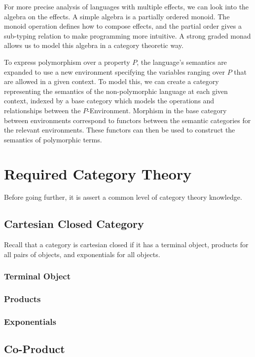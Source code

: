 \documentclass{Report}
\begin{document}
For more precise analysis of languages with multiple effects, we can look into the algebra on the effects. A simple algebra is a partially ordered monoid. The monoid operation defines how to compose effects, and the partial order gives a sub-typing relation to make programming more intuitive. A strong graded monad allows us to model this algebra in a category theoretic way.

To express polymorphism over a property $P$, the language's semantics are expanded to use a new environment specifying the variables ranging over $P$ that are allowed in a given context. To model this, we can create a category representing the semantics of the non-polymorphic language at each given context, indexed by a base category which models the operations and relationships between the $P$-Environment. Morphism in the base category between environments correspond to functors between the semantic categories for the relevant environments. These functors can then be used to construct the semantics of polymorphic terms. 


\chapter{Required Category Theory}

Before going further, it is assert a common level of category theory knowledge.

\section{Cartesian Closed Category}\label{CCC}

Recall that a category is cartesian closed if it has a terminal object, products for all pairs of objects, and exponentials for all objects.

\subsection{Terminal Object}

\subsection{Products}

\subsection{Exponentials}

\section{Co-Product}
\end{document}
